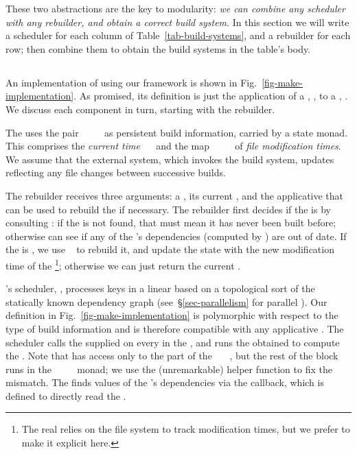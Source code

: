 These two abstractions are the key to modularity: \emph{we can combine any
scheduler with any rebuilder, and obtain a correct build system}.
In this section we will write a scheduler for each column of
Table~\ref{tab-build-systems}, and a rebuilder for each row; then combine them
to obtain the build systems in the table's body.

\subsection{\Make}\label{sec-implementation-make}

An implementation of \Make using our framework is shown in
Fig.~\ref{fig-make-implementation}. As promised, its definition
is just the application of a , ,
to a , .
We discuss each component in turn, starting with the rebuilder.

The  uses the pair
~~\hs{=}~~ as persistent
build information, carried by a state monad. This  comprises
the \emph{current time} ~\hs{::}~ and the map
~\hs{::}~~~ of \emph{file modification
times}. We assume that the external system, which invokes the build system,
updates  reflecting any file changes between successive builds.

The rebuilder receives three arguments: a , its current , and
the applicative  that can be used to rebuild the  if necessary.
The rebuilder first decides if the  is  by consulting
: if the  is not found, that must mean it has never been
built before; otherwise  can see if any of the 's
dependencies (computed by ) are out of date. If the  is
, we use ~ to rebuild it, and update the state with
the new modification time of the \footnote{The real \Make
relies on the file system to track modification times, but we prefer
to make it explicit here.}; otherwise we can just return the current .

\Make's scheduler, , processes keys in a linear  based
on a topological sort of the statically known dependency graph
(see~\S\ref{sec-parallelism} for parallel \Make). Our definition in
Fig.~\ref{fig-make-implementation} is polymorphic with respect to the type of
build information  and is therefore compatible with any applicative
. The scheduler calls the supplied  on every
 in the , and runs the obtained  to compute the
. Note that  has access only to the  part of the
~~~, but the rest of the  block runs in the
~~~~ monad; we use the (unremarkable)
helper function  to fix the mismatch. The  finds
values of the 's dependencies via the  callback, which is
defined to directly read the .

